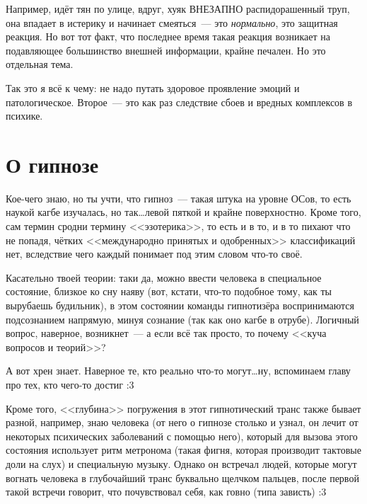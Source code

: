 \documentclass[a5paper,12pt,twoside]{memoir}
\begin{document}
Например, идёт тян по улице, вдруг, хуяк ВНЕЗАПНО распидорашенный труп, она впадает в истерику и начинает смеяться~--- это \textit{нормально}, это защитная реакция. Но вот тот факт, что последнее время такая реакция возникает на подавляющее большинство внешней информации, крайне печален. Но это отдельная тема. 

Так это я всё к чему: не надо путать здоровое проявление эмоций и патологическое. Второе~--- это как раз следствие сбоев и вредных комплексов в психике. 




\section{О гипнозе}

\medskip
Кое-чего знаю, но ты учти, что гипноз~--- такая штука на уровне ОСов, то есть наукой кагбе изучалась, но так\ldots левой пяткой и крайне поверхностно. Кроме того, сам термин сродни термину <<эзотерика>>, то есть и в то, и в то пихают что не попадя, чётких <<международно принятых и одобренных>> классификаций нет, вследствие чего каждый понимает под этим словом что-то своё. 

Касательно твоей теории: таки да, можно ввести человека в специальное состояние, близкое ко сну наяву (вот, кстати, что-то подобное тому, как ты вырубаешь будильник), в этом состоянии команды гипнотизёра воспринимаются подсознанием напрямую, минуя сознание (так как оно кагбе в отрубе). Логичный вопрос, наверное, возникнет~--- а если всё так просто, то почему <<куча вопросов и теорий>>? 

А вот хрен знает. Наверное те, кто реально что-то могут\ldots ну, вспоминаем главу про тех, кто чего-то достиг :3 

Кроме того, <<глубина>> погружения в этот гипнотический транс также бывает разной, например, знаю человека (от него о гипнозе столько и узнал, он лечит от некоторых психических заболеваний с помощью него), который для вызова этого состояния использует ритм метронома (такая фигня, которая производит тактовые доли на слух) и специальную музыку. Однако он встречал людей, которые могут вогнать человека в глубочайший транс буквально щелчком пальцев, после первой такой встречи говорит, что почувствовал себя, как говно (типа зависть) :3 
\end{document}
